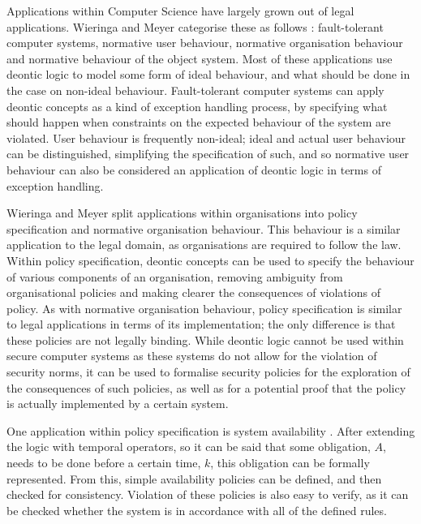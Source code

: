 \documentclass{l4proj}
\begin{document}
Applications within Computer Science have largely grown out of legal applications. Wieringa and Meyer categorise these as follows \cite{meyer93applications}: fault-tolerant computer systems, normative user behaviour, normative organisation behaviour and normative behaviour of the object system. Most of these applications use deontic logic to model some form of ideal behaviour, and what should be done in the case on non-ideal behaviour. Fault-tolerant computer systems can apply deontic concepts as a kind of exception handling process, by specifying what should happen when constraints on the expected behaviour of the system are violated. User behaviour is frequently non-ideal; ideal and actual user behaviour can be distinguished, simplifying the specification of such, and so normative user behaviour can also be considered an application of deontic logic in terms of exception handling. 

Wieringa and Meyer split applications within organisations into policy specification and normative organisation behaviour. This behaviour is a similar application to the legal domain, as organisations are required to follow the law. Within policy specification, deontic concepts can be used to specify the behaviour of various components of an organisation, removing ambiguity from organisational policies and making clearer the consequences of violations of policy. As with normative organisation behaviour, policy specification is similar to legal applications in terms of its implementation; the only difference is that these policies are not legally binding. While deontic logic cannot be used within secure computer systems as these systems do not allow for the violation of security norms, it can be used to formalise security policies for the exploration of the consequences of such policies, as well as for a potential proof that the policy is actually implemented by a certain system. 

One application within policy specification is system availability \cite{brunel04deontic}. After extending the logic with temporal operators, so it can be said that some obligation, $A$, needs to be done before a certain time, $k$, this obligation can be formally represented. From this, simple availability policies can be defined, and then checked for consistency. Violation of these policies is also easy to verify, as it can be checked whether the system is in accordance with all of the defined rules. %
\end{document}
